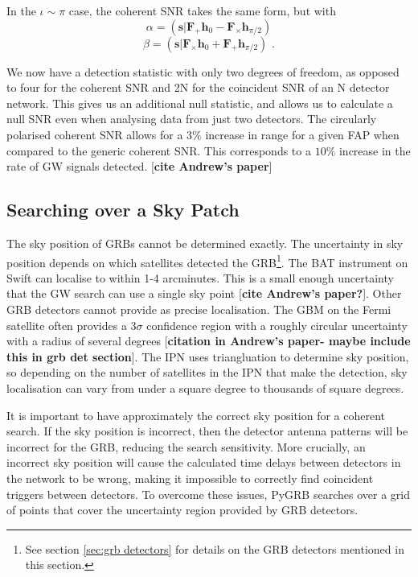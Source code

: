 \documentclass[11pt]{cuthesis}
\newcommand{\fs}{\text{ .}}
\begin{document}
In the $\iota \sim \pi$ case, the coherent SNR takes the same form, but with
\begin{equation}
\alpha = (\textbf{s}|\textbf{F}_+\textbf{h}_0 - \textbf{F}_\times \textbf{h}_{\pi /2} )
\end{equation}
\begin{equation}
\beta =  (\textbf{s}|\textbf{F}_\times\textbf{h}_0 + \textbf{F}_+ \textbf{h}_{\pi /2} ) \fs
\end{equation}

We now have a detection statistic with only two degrees of freedom, as opposed to four for the coherent SNR and 2N for the coincident SNR of an N detector network. This gives us an additional null statistic, and allows us to calculate a null SNR even when analysing data from just two detectors. The circularly polarised coherent SNR allows for a $3\%$ increase in range for a given FAP when compared to the generic coherent SNR. This corresponds to a $10\%$ increase in the rate of GW signals detected. [\textbf{cite Andrew's paper}]


\subsection{Searching over a Sky Patch}
The sky position of GRBs cannot be determined exactly. The uncertainty in sky position depends on which satellites detected the GRB\footnote{See section \ref{sec:grb detectors} for details on the GRB detectors mentioned in this section.}. The BAT instrument on Swift can localise to within 1-4 arcminutes. This is a small enough uncertainty that the GW search can use a single sky point [\textbf{cite Andrew's paper?}]. Other GRB detectors cannot provide as precise localisation. The GBM on the Fermi satellite often provides a 3$\sigma$ confidence region with a roughly circular uncertainty with a radius of several degrees [\textbf{citation in Andrew's paper- maybe include this in grb det section}]. The IPN uses triangluation to determine sky position, so depending on the number of satellites in the IPN that make the detection, sky localisation can vary from under a square degree to thousands of square degrees. 

It is important to have approximately the correct sky position for a coherent search. If the sky position is incorrect, then the detector antenna patterns will be incorrect for the GRB, reducing the search sensitivity. More crucially, an incorrect sky position will cause the calculated time delays between detectors in the network to be wrong, making it impossible to correctly find coincident triggers between detectors. To overcome these issues, PyGRB searches over a grid of points that cover the uncertainty region provided by GRB detectors. 
\end{document}
